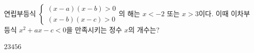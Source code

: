 연립부등식 $\begin{cases} (x-a)(x-b)>0 \\ (x-b)(x-c)>0 \end{cases}$의 해는 $x<-2$ 또는 $x>3$이다. 이때 이차부등식 $x^2+ax-c<0$을 만족시키는 정수 $x$의 개수는? 
\begin{choices32}{$2$}{$3$}{$4$}{$5$}{$6$}\end{choices32}

